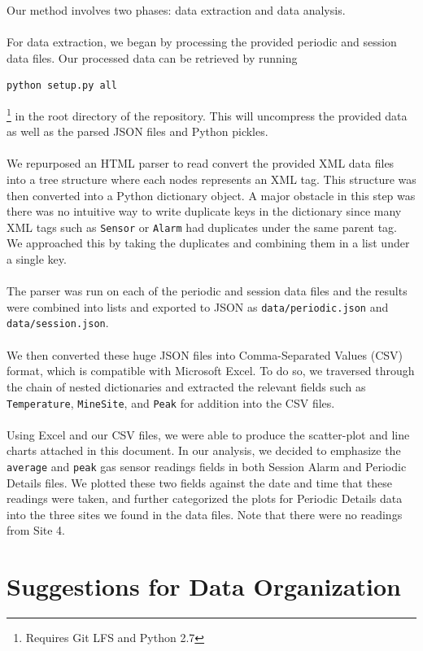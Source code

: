 \documentclass[twoside,twocolumn]{article}
\begin{document}
Our method involves two phases: data extraction and data analysis.\\\\
For data extraction, we began by processing the provided periodic and session data files. Our processed data can be retrieved by running
\begin{verbatim}
python setup.py all
\end{verbatim}\footnote{Requires Git LFS and Python 2.7}
in the root directory of the repository. This will uncompress the provided data as well as the parsed JSON files and Python pickles.\\\\
We repurposed an HTML parser to read convert the provided XML data files into a tree structure where each nodes represents an XML tag. This structure was then converted into a Python dictionary object. A major obstacle in this step was there was no intuitive way to write duplicate keys in the dictionary since many XML tags such as \texttt{Sensor} or \texttt{Alarm} had duplicates under the same parent tag. We approached this by taking the duplicates and combining them in a list under a single key.\\\\
The parser was run on each of the periodic and session data files and the results were combined into lists and exported to JSON as \texttt{data/periodic.json} and \texttt{data/session.json}.\\\\
We then converted these huge JSON files into Comma-Separated Values (CSV) format, which is compatible with Microsoft Excel. To do so, we traversed through the chain of nested dictionaries and extracted the relevant fields such as \texttt{Temperature}, \texttt{MineSite}, and \texttt{Peak} for addition into the CSV files.\\\\
Using Excel and our CSV files, we were able to produce the scatter-plot and line charts attached in this document. In our analysis, we decided to emphasize the \texttt{average} and \texttt{peak} gas sensor readings fields in both Session Alarm and Periodic Details files. We plotted these two fields against the date and time that these readings were taken, and further categorized the plots for Periodic Details data into the three sites we found in the data files. Note that there were no readings from Site 4.


\section{Suggestions for Data Organization}
\end{document}
